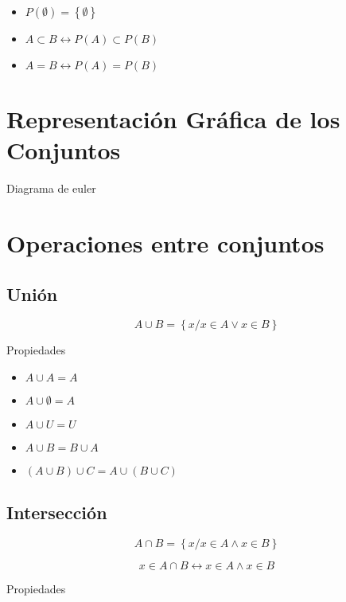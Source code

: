 \documentclass[16pt,]{krantz}
\providecommand{\tightlist}{%
  \setlength{\itemsep}{0pt}\setlength{\parskip}{0pt}}
\theoremstyle{definition}
\theoremstyle{definition}
\theoremstyle{definition}
\theoremstyle{definition}
\theoremstyle{remark}
\begin{document}
\begin{itemize}
\tightlist
\item
  \(P(\emptyset)=\left\{\emptyset\right\}\)
\item
  \(A\subset B\leftrightarrow P(A)\subset P(B)\)
\item
  \(A= B\leftrightarrow P(A)= P(B)\)
\end{itemize}

\hypertarget{representaciuxf3n-gruxe1fica-de-los-conjuntos}{%
\section{Representación Gráfica de los Conjuntos}\label{representaciuxf3n-gruxe1fica-de-los-conjuntos}}

Diagrama de euler

\hypertarget{operaciones-entre-conjuntos}{%
\section{Operaciones entre conjuntos}\label{operaciones-entre-conjuntos}}

\hypertarget{uniuxf3n}{%
\subsection{Unión}\label{uniuxf3n}}

\[
A\cup B
=\left\{x/x\in A\vee x\in B\right\}
\]

Propiedades

\begin{itemize}
\tightlist
\item
  \(A\cup A=A\)
\item
  \(A\cup \emptyset=A\)
\item
  \(A\cup U=U\)
\item
  \(A\cup B=B\cup A\)
\item
  \((A\cup B)\cup C=A\cup(B\cup C)\)
\end{itemize}

\hypertarget{intersecciuxf3n}{%
\subsection{Intersección}\label{intersecciuxf3n}}

\[
A\cap B=\left\{x/x\in A\wedge x\in B\right\}
\]

\[
x\in A\cap B\leftrightarrow x\in A\wedge x\in B
\]

Propiedades
\end{document}
